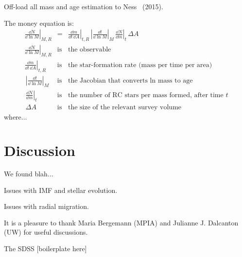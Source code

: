 \documentclass[12pt, preprint]{aastex}
\begin{document}
Off-load all mass and age estimation to Ness \etal\ (2015).

The money equation is:
\begin{eqnarray}
  \left.\frac{\dd N}{\dd\ln M}\right|_{M,R}
  &=&
  \left.\frac{\dd m}{\dd t\,\dd A}\right|_{t,R}
  \,\left|\frac{\dd t}{\dd\ln M}\right|_{M}
  \,\left.\frac{\dd N}{\dd m}\right|_{t}
  \,\Delta A
  \\
  \left.\frac{\dd N}{\dd\ln M}\right|_{M,R}
  &\mbox{is}&
  \mbox{the observable}
  \\
  \left.\frac{\dd m}{\dd t\,\dd A}\right|_{t,R}
  &\mbox{is}&
  \mbox{the star-formation rate (mass per time per area)}
  \\
  \,\left|\frac{\dd t}{\dd\ln M}\right|_{M}
  &\mbox{is}&
  \mbox{the Jacobian that converts $\ln$ mass to age}
  \\
  \,\left.\frac{\dd N}{\dd m}\right|_{t}
  &\mbox{is}&
  \mbox{the number of RC stars per mass formed, after time $t$}
  \\
  \,\Delta A
  &\mbox{is}&
  \mbox{the size of the relevant survey volume}
\end{eqnarray}
where...

\section{Discussion}

We found blah...

Issues with IMF and stellar evolution.

Issues with radial migration.

\acknowledgements
It is a pleasure to thank
  Maria Bergemann (MPIA)
  and
  Julianne J. Dalcanton (UW)
for useful discussions.

The SDSS [boilerplate here]
\end{document}
